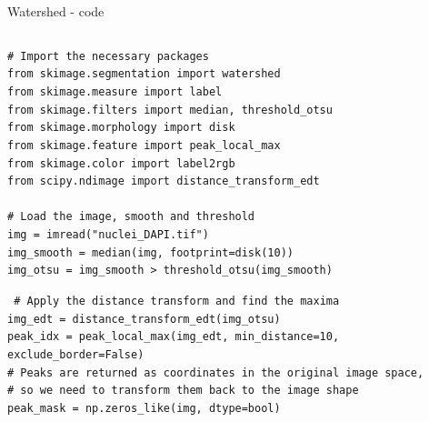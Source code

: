 \documentclass[9pt, aspectratio=169]{beamer}
\begin{document}
\begin{frame}
    {Watershed - code}
    \begin{columns}
        \begin{column}{.7\textwidth}
            {
                \begin{codebox}
                    \texttt{\# Import the necessary packages\\
                        from skimage.segmentation import watershed\\
                        from skimage.measure import label\\
                        from skimage.filters import median, threshold\_otsu\\
                        from skimage.morphology import disk\\
                        from skimage.feature import peak\_local\_max\\
                        from skimage.color import label2rgb\\
                        from scipy.ndimage import distance\_transform\_edt\\
                        \\
                        \pause
                        \# Load the image, smooth and threshold\\
                        img = imread("nuclei\_DAPI.tif")\\
                        img\_smooth = median(img, footprint=disk(10))\\
                        img\_otsu = img\_smooth > threshold\_otsu(img\_smooth)
                    }
                \end{codebox}
            }
            {
                \begin{codebox}
                    \texttt{
                        \# Apply the distance transform and find the maxima\\
                        img\_edt = distance\_transform\_edt(img\_otsu)\\
                        peak\_idx = peak\_local\_max(img\_edt, min\_distance=10, exclude\_border=False)\\
                        \# Peaks are returned as coordinates in the original image space,\\
                        \#  so we need to transform them back to the image shape\\
                        peak\_mask = np.zeros\_like(img, dtype=bool)\\
}
\end{codebox}}
\end{column}
\end{columns}
\end{frame}
\end{document}
